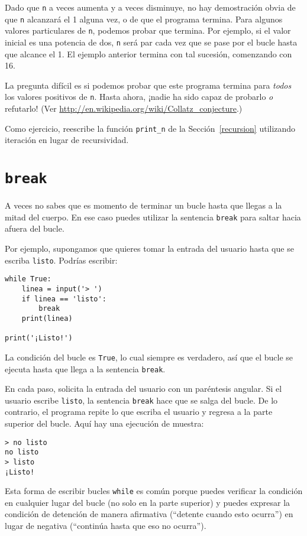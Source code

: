 \documentclass[10pt]{book}
\begin{document}
Dado que {\tt n} a veces aumenta y a veces disminuye, no hay
demostración obvia de que {\tt n} alcanzará el 1 alguna vez, o de que el programa
termina.  Para algunos valores particulares de {\tt n}, podemos probar que
termina.  Por ejemplo, si el valor inicial es una potencia de dos,
{\tt n} será par cada vez que se pase por el bucle
hasta que alcance el 1. El ejemplo anterior termina con tal sucesión,
comenzando con 16.

La pregunta difícil es si podemos probar que este programa termina
para {\em todos} los valores positivos de {\tt n}.  Hasta ahora, ¡nadie ha
sido capaz de probarlo {\em o} refutarlo!  (Ver
  \url{http://en.wikipedia.org/wiki/Collatz_conjecture}.)

Como ejercicio, reescribe la función \verb"print_n" de la
Sección~\ref{recursion} utilizando iteración en lugar de recursividad.


\section{{\tt break}}

A veces no sabes que es momento de terminar un bucle hasta que llegas a la mitad
del cuerpo.  En ese caso puedes utilizar la sentencia {\tt break}
para saltar hacia afuera del bucle.

Por ejemplo, supongamos que quieres tomar la entrada del usuario hasta que
se escriba {\tt listo}.    Podrías escribir:

\begin{verbatim}
while True:
    linea = input('> ')
    if linea == 'listo':
        break
    print(linea)

print('¡Listo!')
\end{verbatim}
%
La condición del bucle es {\tt True}, lo cual siempre es verdadero, así que el
bucle se ejecuta hasta que llega a la sentencia {\tt break}.

En cada paso, solicita la entrada del usuario con un paréntesis angular.
Si el usuario escribe {\tt listo}, la sentencia {\tt break} hace que se salga
del bucle.  De lo contrario, el programa repite lo que escriba el usuario
y regresa a la parte superior del bucle.  Aquí hay una ejecución de muestra:

\begin{verbatim}
> no listo
no listo
> listo
¡Listo!
\end{verbatim}
%
Esta forma de escribir bucles {\tt while} es común porque puedes
verificar la condición en cualquier lugar del bucle (no solo en la
parte superior) y puedes expresar la condición de detención de manera afirmativa
(``detente cuando esto ocurra'') en lugar de negativa (``continúa
hasta que eso no ocurra'').
\end{document}
